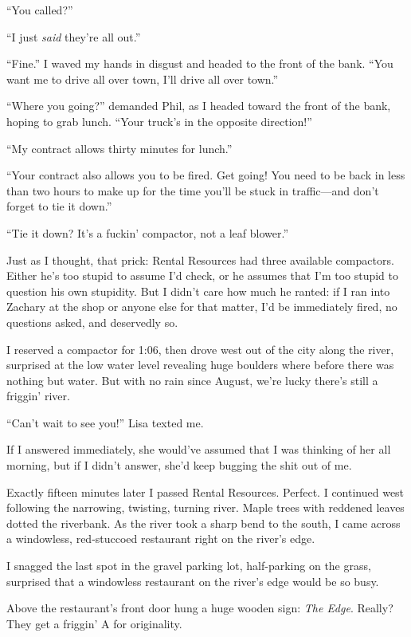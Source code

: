 ``You called?''

``I just \emph{said} they're all out.''

``Fine.'' I waved my hands in disgust and headed to the front of the
bank. ``You want me to drive all over town, I'll drive all over town.''

``Where you going?'' demanded Phil, as I headed toward the front of the
bank, hoping to grab lunch. ``Your truck's in the opposite direction!''

``My contract allows thirty minutes for lunch.''

``Your contract also allows you to be fired. Get going! You need to be
back in less than two hours to make up for the time you'll be stuck in
traffic---and don't forget to tie it down.''

``Tie it down? It's a fuckin' compactor, not a leaf blower.''

Just as I thought, that prick: Rental Resources had three available
compactors. Either he's too stupid to assume I'd check, or he assumes
that I'm too stupid to question his own stupidity. But I didn't care how
much he ranted: if I ran into Zachary at the shop or anyone else for
that matter, I'd be immediately fired, no questions asked, and
deservedly so.

I reserved a compactor for 1:06, then drove west out of the city along
the river, surprised at the low water level revealing huge boulders
where before there was nothing but water. But with no rain since August,
we're lucky there's still a friggin' river.

``Can't wait to see you!'' Lisa texted me.

If I answered immediately, she would've assumed that I was thinking of
her all morning, but if I didn't answer, she'd keep bugging the shit out
of me.

Exactly fifteen minutes later I passed Rental Resources. Perfect. I
continued west following the narrowing, twisting, turning river. Maple
trees with reddened leaves dotted the riverbank. As the river took a
sharp bend to the south, I came across a windowless, red-stuccoed
restaurant right on the river's edge.

I snagged the last spot in the gravel parking lot, half-parking on the
grass, surprised that a windowless restaurant on the river's edge would
be so busy.

Above the restaurant's front door hung a huge wooden sign: \emph{The
Edge}. Really? They get a friggin' A for originality.

